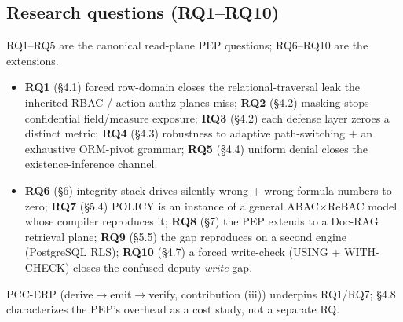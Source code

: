 \documentclass[runningheads]{llncs}
\begin{document}
\subsection{Research questions (RQ1--RQ10)}
RQ1--RQ5 are the canonical read-plane PEP questions; RQ6--RQ10 are the extensions.

\begin{itemize}[leftmargin=*,nosep]
  \item \textbf{RQ1} (\S4.1) forced row-domain closes the relational-traversal leak the inherited-RBAC /
        action-authz planes miss; \textbf{RQ2} (\S4.2) masking stops confidential field/measure exposure;
        \textbf{RQ3} (\S4.2) each defense layer zeroes a distinct metric; \textbf{RQ4} (\S4.3) robustness to
        adaptive path-switching + an exhaustive ORM-pivot grammar; \textbf{RQ5} (\S4.4) uniform denial closes the
        existence-inference channel.
  \item \textbf{RQ6} (\S6) integrity stack drives silently-wrong + wrong-formula numbers to zero; \textbf{RQ7}
        (\S5.4) POLICY is an instance of a general ABAC$\times$ReBAC model whose compiler reproduces it;
        \textbf{RQ8} (\S7) the PEP extends to a Doc-RAG retrieval plane; \textbf{RQ9} (\S5.5) the gap reproduces
        on a second engine (PostgreSQL RLS); \textbf{RQ10} (\S4.7) a forced write-check (USING + WITH-CHECK)
        closes the confused-deputy \emph{write} gap.
\end{itemize}
\noindent PCC-ERP (derive$\to$emit$\to$verify, contribution (iii)) underpins RQ1/RQ7; \S4.8 characterizes the
PEP's overhead as a cost study, not a separate RQ.

\end{document}
